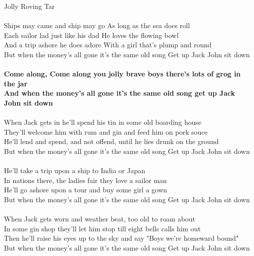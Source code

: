 \documentclass[letterpaper,9pt]{article}
\begin{document}
\newpage
{}
\huge
Jolly Roving Tar\\
\\
\Large
\noindent
Ships may came and ship may go As long as the sea does roll
\\Each sailor lad just like his dad He loves the flowing bowl
\\And a trip ashore he does adore With a girl that's plump and round 
\\But when the money's all gone it's the same old song Get up Jack John sit down
\\
\large
\\\textbf{Come along, Come along you jolly brave boys there’s lots of grog in the jar
\\And when the money's all gone it's the same old song get up Jack John sit down}
\\
\Large
\\When Jack gets in he'll spend his tin in some old boarding house
\\They'll welcome him with rum and gin and feed him on pork souce
\\He'll lend and spend, and not offend, until he lies drunk on the ground
\\But when the money's all gone it's the same old song Get up Jack John sit down
\\
\\He'll take a trip upon a ship to India or Japan
\\In nations there, the ladies fair they love a sailor man
\\He'll go ashore upon a tour and buy some girl a gown
\\But when the money's all gone it's the same old song Get up Jack John sit down
\\
\\When Jack gets worn and weather beat, too old to roam about
\\In some gin shop they'll let him stop till eight bells calls him out
\\Then he'll raise his eyes up to the sky and say "Boys we're homeward bound"
\\But when the money's all gone it's the same old song Get up Jack John sit down
\end{document}
